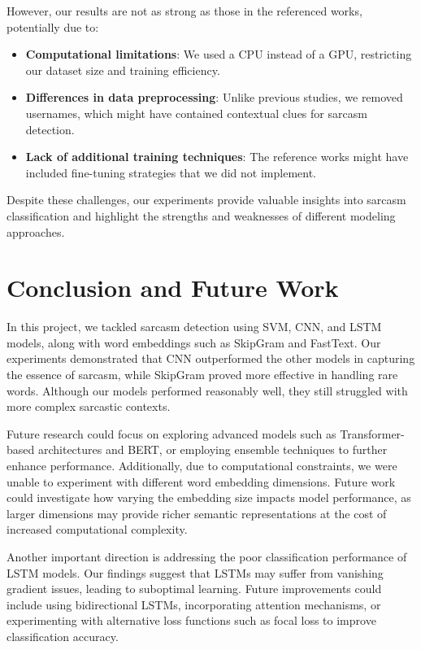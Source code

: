 \documentclass[11pt]{article}
\begin{document}
However, our results are not as strong as those in the referenced works, potentially due to:
\begin{itemize}
    \item \textbf{Computational limitations}: We used a CPU instead of a GPU, restricting our dataset size and training efficiency.
    \item \textbf{Differences in data preprocessing}: Unlike previous studies, we removed usernames, which might have contained contextual clues for sarcasm detection.
    \item \textbf{Lack of additional training techniques}: The reference works might have included fine-tuning strategies that we did not implement.
\end{itemize}

Despite these challenges, our experiments provide valuable insights into sarcasm classification and highlight the strengths and weaknesses of different modeling approaches.

\section{Conclusion and Future Work}
In this project, we tackled sarcasm detection using SVM, CNN, and LSTM models, along with word embeddings such as SkipGram and FastText. Our experiments demonstrated that CNN outperformed the other models in capturing the essence of sarcasm, while SkipGram proved more effective in handling rare words. Although our models performed reasonably well, they still struggled with more complex sarcastic contexts.

Future research could focus on exploring advanced models such as Transformer-based architectures and BERT, or employing ensemble techniques to further enhance performance. Additionally, due to computational constraints, we were unable to experiment with different word embedding dimensions. Future work could investigate how varying the embedding size impacts model performance, as larger dimensions may provide richer semantic representations at the cost of increased computational complexity.

Another important direction is addressing the poor classification performance of LSTM models. Our findings suggest that LSTMs may suffer from vanishing gradient issues, leading to suboptimal learning. Future improvements could include using bidirectional LSTMs, incorporating attention mechanisms, or experimenting with alternative loss functions such as focal loss to improve classification accuracy.
\end{document}
